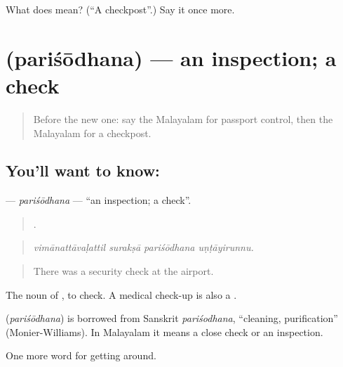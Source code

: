 \begin{tcolorbox}[breakable,colback=teal!4,colframe=teal!35!black,title={Before you move on}]
What does  mean? (\textquotedblleft{}A checkpost\textquotedblright{}.) Say it once more.
\end{tcolorbox}
\section[\texorpdfstring{\ml{പരിശോധന} (pariśōdhana)}{പരിശോധന (pariśōdhana)}]{ (pariśōdhana) — an inspection; a check}

\label{lesson:ML-C464-parisodhana}



\begin{quote}
Before the new one: say the Malayalam for passport control, then the Malayalam for a checkpost.
\end{quote}

\subsection*{You'll want to know: }
\textbf{} — \emph{pariśōdhana} — \textquotedblleft{}an inspection; a check\textquotedblright{}.

\begin{quote}
   .
\end{quote}

\begin{quote}
\emph{vimānattāvaḷattil surakṣā pariśōdhana uṇṭāyirunnu.}
\end{quote}

\begin{quote}
There was a security check at the airport.
\end{quote}

The noun of , to check. A medical check-up is also a .

\begin{cousinweb}
\textbf{} (\emph{pariśōdhana}) is borrowed from Sanskrit \emph{pariśodhana}, \textquotedblleft{}cleaning, purification\textquotedblright{} (Monier-Williams). In Malayalam it means a close check or an inspection.
\end{cousinweb}

\begin{grammarlens}[title={What you've built}]
One more word for getting around.
\end{grammarlens}

